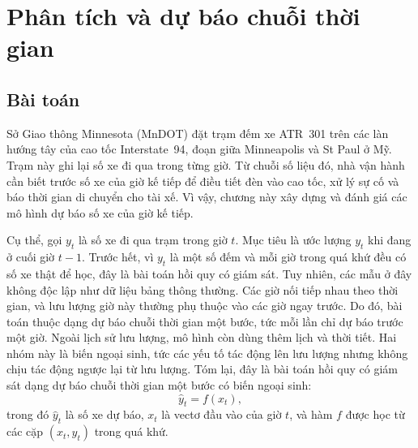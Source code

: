 \chapter{Phân tích và dự báo chuỗi thời gian}
\label{chap:timeseries}
\sloppy %


\section{Bài toán}
\label{sec:ts-problem}

Sở Giao thông Minnesota (MnDOT) đặt trạm đếm xe ATR~301 trên các làn hướng tây của cao tốc Interstate~94, đoạn giữa Minneapolis và
St Paul ở Mỹ. Trạm này ghi lại số xe đi qua trong từng giờ. Từ chuỗi số liệu đó, nhà vận hành cần biết trước số xe của giờ kế tiếp để điều
tiết đèn vào cao tốc, xử lý sự cố và báo thời gian di chuyển cho tài xế. Vì vậy, chương này xây dựng và đánh giá các mô hình dự báo số xe
của giờ kế tiếp.

Cụ thể, gọi $y_t$ là số xe đi qua trạm trong giờ $t$. Mục tiêu là ước lượng $y_t$ khi đang ở cuối giờ $t-1$. Trước hết, vì $y_t$ là một số
đếm và mỗi giờ trong quá khứ đều có số xe thật để học, đây là bài toán hồi quy có giám sát. Tuy nhiên, các mẫu ở đây không độc lập như dữ
liệu bảng thông thường. Các giờ nối tiếp nhau theo thời gian, và lưu lượng giờ này thường phụ thuộc vào các giờ ngay trước. Do đó, bài toán
thuộc dạng dự báo chuỗi thời gian một bước, tức mỗi lần chỉ dự báo trước một giờ. Ngoài lịch sử lưu lượng, mô hình còn dùng thêm lịch và
thời tiết. Hai nhóm này là biến ngoại sinh, tức các yếu tố tác động lên lưu lượng nhưng không chịu tác động ngược lại từ lưu lượng. Tóm
lại, đây là bài toán hồi quy có giám sát dạng dự báo chuỗi thời gian một bước có biến ngoại sinh:
\[
\hat y_t = f(x_t),
\]
trong đó $\hat y_t$ là số xe dự báo, $x_t$ là vectơ đầu vào của giờ $t$, và hàm $f$ được học từ các cặp $(x_t, y_t)$ trong quá khứ.

